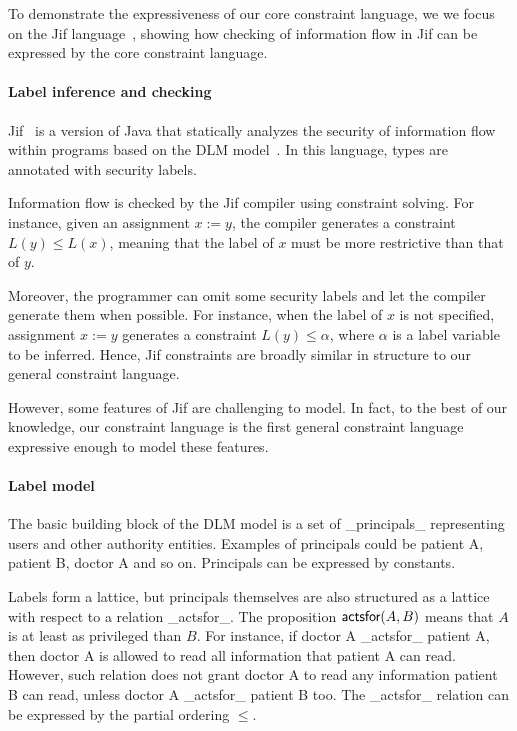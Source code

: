 To demonstrate the expressiveness of our core  constraint language, we
we focus on the Jif language~\cite{jif}, showing how 
checking of information flow in Jif can be expressed by
the core constraint language.

\paragraph{Label inference and checking}

Jif~\cite{jif} is a version of Java that statically analyzes the security of
information flow within programs based on the DLM model~\cite{ml-ifc-97}. In
this language, types are annotated with security labels.

Information flow is checked by the Jif compiler using constraint
solving. For instance, given an assignment $x := y$, the compiler
generates a constraint $L(y)\leq L(x)$, meaning that the
label of $x$ must be more restrictive than that of $y$.

Moreover, the programmer can omit some security labels and let the
compiler generate them when possible. For instance, when the label of
$x$ is not specified, assignment $x := y$ generates a constraint
$L(y)\leq \alpha$, where $\alpha$ is a label variable to be inferred.
Hence, Jif constraints are broadly similar in structure
to our general constraint language.

However, some features of Jif are challenging to model.  In fact, to
the best of our knowledge, our constraint language is the first
general constraint language expressive enough to model these features.

\paragraph{Label model}

The basic building block of the DLM model is a set of _principals_
representing users and other authority entities. Examples of
principals could be patient A, patient B, doctor A and so on.
Principals can be expressed by constants.

Labels form a lattice, but principals themselves are also structured
as a lattice with respect to a relation _actsfor_.  The proposition
$\textsf{actsfor}(A,B)$ means that $A$ is at least as privileged than
$B$.
% 
For instance, if doctor A _actsfor_ patient A, then doctor A is
allowed to read all information that patient A can read. However, such
relation does not grant doctor A to read any information patient B can
read, unless doctor A _actsfor_ patient B too. The _actsfor_ relation
can be expressed by the partial ordering $\leq$.

